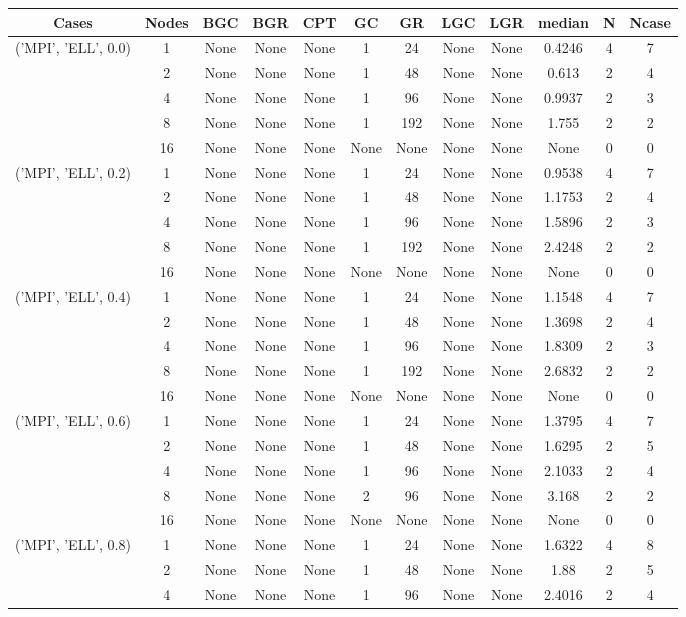 \begin{tabular}{cccccccccccc}
\hline
Cases & Nodes& BGC& BGR& CPT& GC& GR& LGC& LGR& median & N & Ncase \\
\hline
\multirow{5}{*}{('MPI', 'ELL', 0.0)}& 1& None& None& None& 1& 24& None& None& 0.4246& 4& 7\\
& 2& None& None& None& 1& 48& None& None& 0.613& 2& 4\\
& 4& None& None& None& 1& 96& None& None& 0.9937& 2& 3\\
& 8& None& None& None& 1& 192& None& None& 1.755& 2& 2\\
& 16& None& None& None& None& None& None& None& None& 0& 0\\
\hline
\multirow{5}{*}{('MPI', 'ELL', 0.2)}& 1& None& None& None& 1& 24& None& None& 0.9538& 4& 7\\
& 2& None& None& None& 1& 48& None& None& 1.1753& 2& 4\\
& 4& None& None& None& 1& 96& None& None& 1.5896& 2& 3\\
& 8& None& None& None& 1& 192& None& None& 2.4248& 2& 2\\
& 16& None& None& None& None& None& None& None& None& 0& 0\\
\hline
\multirow{5}{*}{('MPI', 'ELL', 0.4)}& 1& None& None& None& 1& 24& None& None& 1.1548& 4& 7\\
& 2& None& None& None& 1& 48& None& None& 1.3698& 2& 4\\
& 4& None& None& None& 1& 96& None& None& 1.8309& 2& 3\\
& 8& None& None& None& 1& 192& None& None& 2.6832& 2& 2\\
& 16& None& None& None& None& None& None& None& None& 0& 0\\
\hline
\multirow{5}{*}{('MPI', 'ELL', 0.6)}& 1& None& None& None& 1& 24& None& None& 1.3795& 4& 7\\
& 2& None& None& None& 1& 48& None& None& 1.6295& 2& 5\\
& 4& None& None& None& 1& 96& None& None& 2.1033& 2& 4\\
& 8& None& None& None& 2& 96& None& None& 3.168& 2& 2\\
& 16& None& None& None& None& None& None& None& None& 0& 0\\
\hline
\multirow{5}{*}{('MPI', 'ELL', 0.8)}& 1& None& None& None& 1& 24& None& None& 1.6322& 4& 8\\
& 2& None& None& None& 1& 48& None& None& 1.88& 2& 5\\
& 4& None& None& None& 1& 96& None& None& 2.4016& 2& 4\\

\end{tabular}
